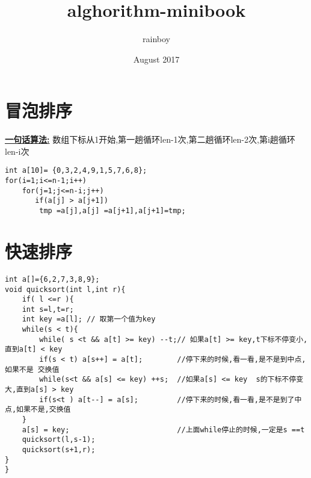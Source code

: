 \documentclass{article}
\title{alghorithm-minibook}
\author{rainboy }
\date{August 2017}
\begin{document}
{\setmainfont{FOT-MatissePro-EB.otf}
\maketitle
}
\newpage
\tableofcontents
\pagebreak


\section{冒泡排序}

\textbf{\underline{一句话算法:}} 数组下标从1开始,第一趟循环len-1次,第二趟循环len-2次,第i趟循环len-i次 

\begin{lstlisting}
int a[10]= {0,3,2,4,9,1,5,7,6,8};
for(i=1;i<=n-1;i++)
    for(j=1;j<=n-i;j++)
       if(a[j] > a[j+1])   
        tmp =a[j],a[j] =a[j+1],a[j+1]=tmp;
\end{lstlisting}


\section{快速排序}

\begin{lstlisting}
int a[]={6,2,7,3,8,9};
void quicksort(int l,int r){
    if( l <=r ){
    int s=l,t=r;
    int key =a[l]; // 取第一个值为key
    while(s < t){
        while( s <t && a[t] >= key) --t;// 如果a[t] >= key,t下标不停变小,直到a[t] < key
        if(s < t) a[s++] = a[t];        //停下来的时候,看一看,是不是到中点,如果不是 交换值
        while(s<t && a[s] <= key) ++s;  //如果a[s] <= key  s的下标不停变大,直到a[s] > key
        if(s<t ) a[t--] = a[s];         //停下来的时候,看一看,是不是到了中点,如果不是,交换值
    }
    a[s] = key;                         //上面while停止的时候,一定是s ==t
    quicksort(l,s-1);
    quicksort(s+1,r);
}
}
\end{lstlisting}
\end{document}
